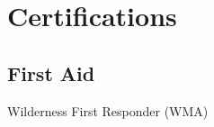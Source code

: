 \documentclass[letterpaper]{deedy-resume} %
\begin{document}
\begin{minipage}[t]{0.33\textwidth}
\sectionspace %


\section{Certifications}
\subsection{First Aid}
Wilderness First Responder (WMA) \\

\sectionspace %


\end{minipage} %
\hfill
%
%
\end{document}
